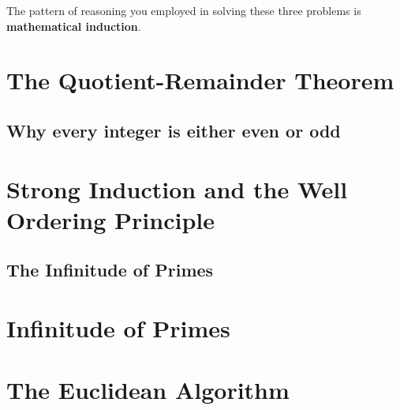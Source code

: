 The pattern of reasoning you employed in solving these three problems is \textbf{mathematical induction}.

\begin{principle}
	
	\end{principle}
\section{The Quotient-Remainder Theorem}

\subsection{Why every integer is either even or odd}

\section{Strong Induction and the Well Ordering Principle}

\subsection{The Infinitude of Primes}

\section{Infinitude of Primes}

\section{The Euclidean Algorithm}

